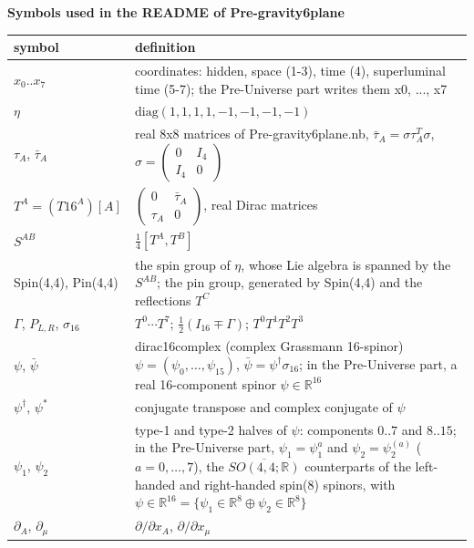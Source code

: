 \documentclass[10pt]{article}
\begin{document}
{\raggedright\LARGE\bfseries Symbols used in the README of Pre-gravity6plane\par}\medskip

{\small\begin{longtable}{>{\raggedright\arraybackslash}p{}>{\raggedright\arraybackslash}p{}}\toprule
symbol & definition \\\midrule\endhead
\bottomrule\endfoot
$x_0..x_7$ & coordinates: hidden, space (1-3), time (4), superluminal time (5-7); the Pre-Universe part writes them x0, ..., x7 \\
$\eta$ & $\mathrm{diag}(1,1,1,1,-1,-1,-1,-1)$ \\
$\tau_A$, $\bar\tau_A$ & real 8x8 matrices of Pre-gravity6plane.nb, $\bar\tau_A = \sigma\tau_A^T\sigma$, $\sigma = \begin{pmatrix}0&I_4\\ I_4&0\end{pmatrix}$ \\
$T^A = (T16^A)[A]$ & $\begin{pmatrix}0&\bar\tau_A\\ \tau_A&0\end{pmatrix}$, real Dirac matrices \\
$S^{AB}$ & $\frac14[T^A,T^B]$ \\
Spin(4,4), Pin(4,4) & the spin group of $\eta$, whose Lie algebra is spanned by the $S^{AB}$; the pin group, generated by Spin(4,4) and the reflections $T^C$ \\
$\Gamma$, $P_{L,R}$, $\sigma_{16}$ & $T^0\cdots T^7$; $\frac12(I_{16}\mp\Gamma)$; $T^0T^1T^2T^3$ \\
$\psi$, $\bar\psi$ & dirac16complex (complex Grassmann 16-spinor) $\psi = (\psi_0,\dots,\psi_{15})$, $\bar\psi = \psi^\dagger\sigma_{16}$; in the Pre-Universe part, a real 16-component spinor $\psi\in\mathbb R^{16}$ \\
$\psi^\dagger$, $\psi^*$ & conjugate transpose and complex conjugate of $\psi$ \\
$\psi_1$, $\psi_2$ & type-1 and type-2 halves of $\psi$: components $0..7$ and $8..15$; in the Pre-Universe part, $\psi_1 = \psi_1^a$ and $\psi_2 = \psi_2^{(a)}$ ($a = 0, \dots, 7$), the $\overline{SO(4,4;\mathbb R)}$ counterparts of the left-handed and right-handed spin(8) spinors, with $\psi\in\mathbb R^{16} = \{\psi_1\in\mathbb R^8\oplus\psi_2\in\mathbb R^8\}$ \\
$\partial_A$, $\partial_\mu$ & $\partial/\partial x_A$, $\partial/\partial x_\mu$ \\

\end{longtable}}
\end{document}
